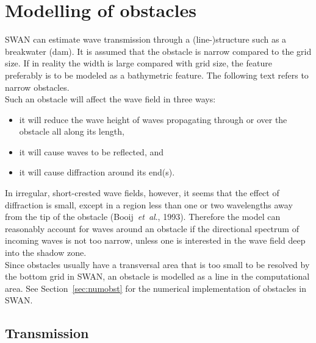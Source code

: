 \documentclass[12pt]{book}
\begin{document}
\section{Modelling of obstacles} \label{sec:obstac}

SWAN can estimate wave transmission through a (line-)structure such as a breakwater (dam).
It is assumed that the obstacle is narrow compared to the grid size.
If in reality the width is large compared with grid size,
the feature preferably is to be modeled as a bathymetric feature.
The following text refers to narrow obstacles.
\\[2ex]
\noindent
Such an obstacle will affect the wave field in three ways:
\begin{itemize}
  \item it will reduce the wave height of waves propagating through or over the obstacle all along its length,
  \item it will cause waves to be reflected, and
  \item it will cause diffraction around its end(s).
\end{itemize}
In irregular, short-crested wave fields, however, it seems that the effect of diffraction is small, except in a
region less than one or two wavelengths away from the tip of the obstacle (Booij~{\it et~al}., 1993). Therefore
the model can reasonably account for waves around an obstacle if the directional spectrum of incoming
waves is not too narrow, unless one is interested in the wave field deep into the shadow zone.
\\[2ex]
\noindent
Since obstacles usually have a transversal area that is too small to be resolved
by the bottom grid in SWAN, an obstacle is modelled as a line in the computational area. See Section~\ref{sec:numobst}
for the numerical implementation of obstacles in SWAN.

\subsection{Transmission}
\end{document}
